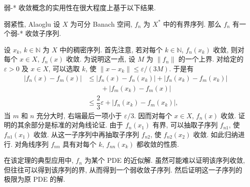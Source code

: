 弱-* 收敛概念的实用性在很大程度上基于以下结果.

\begin{Theorem}{弱紧性, Alaoglu}
\label{thm:alaoglu-weak-star-subsequence}
设 $X$ 为可分 Banach 空间, $f_n$ 为 $X^*$ 中的有界序列. 那么 $f_n$ 有一个弱-* 收敛子序列.
\end{Theorem}

\begin{Proof}
设 $x_k$, $k\in\mathbb{N}$ 为 $X$ 中的稠密序列. 首先注意, 若对每个 $k\in\mathbb{N}$, $f_n(x_k)$ 收敛, 则对每个 $x\in X$, $f_n(x)$ 收敛. 为说明这一点, 设 $M$ 为 $\|f_n\|$ 的一个上界. 对给定的 $\varepsilon>0$ 及 $x\in X$, 可以选取 $k$, 使 $\|x-x_k\|\leq\varepsilon/(3M)$. 于是有
\begin{equation}\label{eq:alaoglu-dense-set-cauchy-estimate}
\begin{aligned}
|f_n(x)-f_m(x)|&\leq|f_n(x)-f_n(x_k)|+|f_n(x_k)-f_m(x_k)|\\
&\qquad+|f_m(x_k)-f_m(x)|\\
&\leq\dfrac{2}{3}\varepsilon+|f_n(x_k)-f_m(x_k)|,
\end{aligned}
\end{equation}
当 $m$ 和 $n$ 充分大时, 右端最后一项小于 $\varepsilon/3$. 因而对每个 $x\in X$, $f_n(x)$ 收敛. 证明的其余部分是标准的对角线论证. 由于 $f_n(x_1)$ 有界, 可以抽取子序列 $f_{n1}$, 使 $f_{n1}(x_1)$ 收敛. 从这一子序列中再抽取子序列 $f_{n2}$, 使 $f_{n2}(x_2)$ 收敛. 如此归纳进行. 对角线序列 $f_{nn}$ 具有对每个 $k$, $f_{nn}(x_k)$ 都收敛的性质.
\end{Proof}

\begin{Remark}
\label{rem:weak-compactness-approximate-pde-solutions}
在该定理的典型应用中, $f_n$ 为某个 PDE 的近似解. 虽然可能难以证明该序列收敛, 但往往可以得到该序列的界, 从而得到一个弱收敛子序列. 然后证明这一子序列的极限为原 PDE 的解.
\end{Remark}
